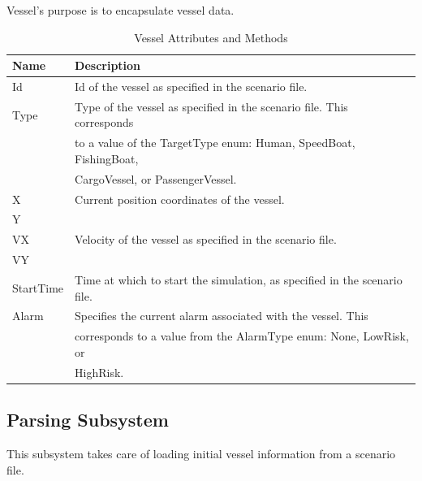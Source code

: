 \documentclass[12pt]{article}
\begin{document}
\vspace*{0.2in}
\vspace*{0.15in}
Vessel’s purpose is to encapsulate vessel data.
\begin{table}[ht]
\centering
   \begin{tabular}{|l|l|}
        \hline
        {\large Name} & {\large Description} \\
        \hline\hline
        Id & Id of the vessel as specified in the scenario file.\\
        \hline
        Type & Type of the vessel as specified in the scenario file. This corresponds\\
        & to a value of the TargetType enum: Human, SpeedBoat, FishingBoat,\\
        & CargoVessel, or PassengerVessel.\\
        \hline
        X & Current position coordinates of the vessel. \\
        Y &  \\
        \hline
        VX & Velocity of the vessel as specified in the scenario file.\\
        VY &  \\
        \hline
        StartTime & Time at which to start the simulation, as specified in the scenario file.\\
        \hline
        Alarm & Specifies the current alarm associated with the vessel. This\\
        & corresponds to a value from the AlarmType enum: None, LowRisk, or\\
        & HighRisk.\\
        \hline
    \end{tabular}
\caption{Vessel Attributes and Methods}
\end{table}
\clearpage

\subsection{Parsing Subsystem}
This subsystem takes care of loading initial vessel information from a scenario file.
\end{document}
